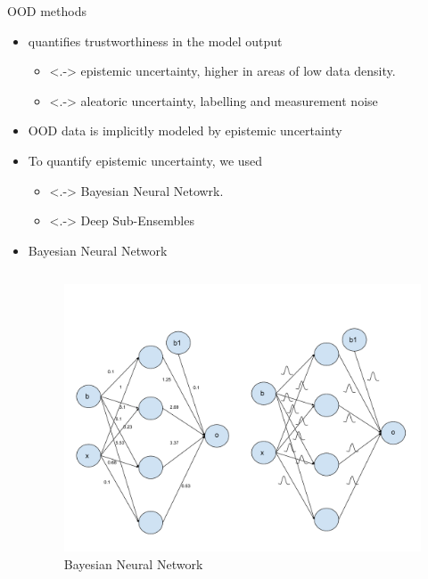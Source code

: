 \documentclass[10pt, aspectratio=169]{beamer}
\begin{document}
\begin{frame}[allowframebreaks]{OOD methods}
\begin{itemize}
            \begin{itemize}
                \item quantifies trustworthiness in the model output
                \begin{itemize}
                        \item<.-> epistemic uncertainty, higher in areas of low data density.
                        \item<.-> aleatoric uncertainty, labelling and measurement noise
                \end{itemize}
                \item OOD data is implicitly modeled by epistemic uncertainty
                \item To quantify epistemic uncertainty, we used
                \begin{itemize}
                    \item<.-> Bayesian Neural Netowrk.
                    \item<.-> Deep Sub-Ensembles
                \end{itemize}
            \end{itemize}
            \pagebreak
        \begin{itemize}
            \item Bayesian Neural Network
            \begin{columns}
                   \begin{figure}
                        \centering
                        \includegraphics[scale=0.275]{images/BNN.pdf}
                        \caption{Bayesian Neural Network}
                   \end{figure}
                   

\end{columns}
\end{itemize}
\end{itemize}
\end{frame}
\end{document}
